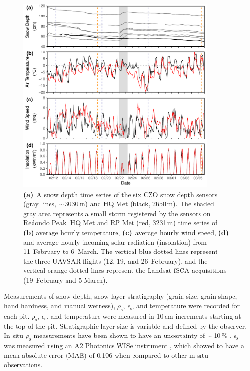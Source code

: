 \begin{figure}[t]
\centering
\includegraphics[width=10cm]{figures/ch3_figs/fig05.pdf}
\caption{\textbf{(a)}~A snow depth time series of the six CZO snow depth sensors (gray lines, $\sim$\,3030\,m) and HQ Met (black, 2650\,m). The shaded gray area represents a small storm registered by the sensors on Redondo Peak. HQ Met and RP Met (red, 3231\,m) time series of \textbf{(b)} average hourly temperature, \textbf{(c)}~average hourly wind speed, \textbf{(d)} and average hourly incoming solar radiation (insolation) from 11~February to 6~March. The vertical blue dotted lines represent the three UAVSAR flights (12, 19, and 26~February), and the vertical orange dotted lines represent the Landsat fSCA acquisitions (19~February and 5 March).}
\end{figure}

Measurements of snow depth, snow layer stratigraphy (grain size, grain shape, hand hardness, and manual wetness), $\rho_\mathrm{s}$, $\epsilon_\mathrm{s}$, and temperature were recorded for each pit. $\rho_\mathrm{s}$, $\epsilon_\mathrm{s}$, and temperature were measured in 10\,cm increments starting at the top of the pit. Stratigraphic layer size is variable and defined by the observer. In situ $\rho_\mathrm{s}$ measurements have been shown to have an uncertainty of $\sim$\,10\,\% \citep{congerComparisonDensityCutters2009, prokschIntercomparisonSnowDensity2016}. $\epsilon_\mathrm{s}$ was measured using an A2 Photonics WISe instrument \citep{A2PhotonicWISe2021}, which \citet{webbSituDeterminationDry2021} showed to have a mean absolute error (MAE) of 0.106 when compared to other in situ observations.


